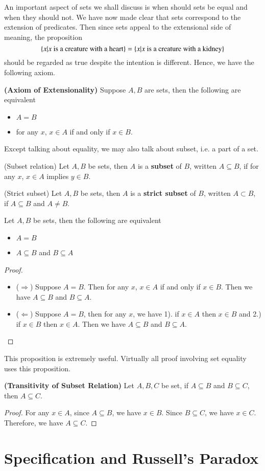 An important aspect of sets we shall discuss is when should sets be equal and when they should not. We have now made clear that sets correspond to the extension of predicates. Then since sets appeal to the extensional side of meaning, the proposition 
\begin{equation*}
    \{x|x\text{ is a creature with a heart}\} = \{x|x\text{ is a creature with a kidney}\}
\end{equation*}
should be regarded as true despite the intention is different. Hence, we have the following axiom.
\begin{ax}
    \textbf{(Axiom of Extensionality)} Suppose $A,B$ are sets, then the following are equivalent
    \begin{itemize}
        \item $A = B$
        \item for any $x$, $x\in A$ if and only if $x\in B$.
    \end{itemize}
Except talking about equality, we may also talk about subset, i.e. a part of a set.
\end{ax}
\begin{defn}
    (Subset relation) Let $A,B$ be sets, then $A$ is a \textbf{subset} of $B$, written $A\subseteq B$, if for any $x$, $x\in A$ implies $y\in B$.
\end{defn}
\begin{defn}
    (Strict subset) Let $A,B$ be sets, then $A$ is a \textbf{strict subset} of $B$, written $A\subset B$, if $A\subseteq B$ and $A\neq B$.
\end{defn}
\begin{prop}
    Let $A,B$ be sets, then the following are equivalent
    \begin{itemize}
        \item $A=B$
        \item $A\subseteq B$ and $B\subseteq A$
    \end{itemize}
\end{prop}
\begin{proof}
    ~ 
    \begin{itemize}
        \item ($\Rightarrow$) Suppose $A=B$. Then for any $x$, $x\in A$ if and only if $x\in B$. Then we have $A\subseteq B$ and $B\subseteq A$.
        \item ($\Leftarrow$) Suppose $A= B$, then for any $x$, we have 1). if $x\in A$ then $x\in B$ and 2.) if $x\in B$ then $x\in A$. Then we have $A\subseteq B$ and $B\subseteq A$.
    \end{itemize}
\end{proof}
\begin{rem}
    This proposition is extremely useful. Virtually all proof involving set equality uses this proposition.
\end{rem}
\begin{prop}
    \textbf{(Transitivity of Subset Relation)} Let $A,B,C$ be set, if $A\subseteq B$ and $B\subseteq C$, then $A\subseteq C$.
\end{prop}
\begin{proof}
    For any $x\in A$, since $A\subseteq B$, we have $x\in B$. Since $B\subseteq C$, we have $x\in C$. Therefore, we have $A\subseteq C$.
\end{proof}
\section{Specification and Russell's Paradox}\